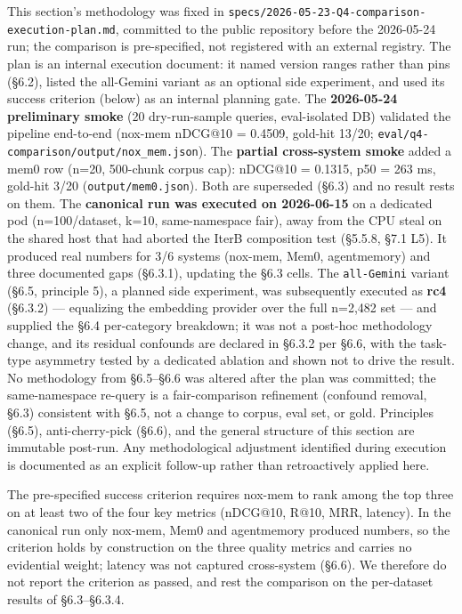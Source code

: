 \documentclass[
]{article}
\begin{document}
This section's methodology was fixed in
\texttt{specs/2026-05-23-Q4-comparison-execution-plan.md}, committed to
the public repository before the 2026-05-24 run; the comparison is
pre-specified, not registered with an external registry. The plan is an
internal execution document: it named version ranges rather than pins
(§6.2), listed the all-Gemini variant as an optional side experiment,
and used its success criterion (below) as an internal planning gate. The
\textbf{2026-05-24 preliminary smoke} (20 dry-run-sample queries,
eval-isolated DB) validated the pipeline end-to-end (nox-mem nDCG@10 =
0.4509, gold-hit 13/20;
\texttt{eval/q4-comparison/output/nox\_mem.json}). The \textbf{partial
cross-system smoke} added a mem0 row (n=20, 500-chunk corpus cap):
nDCG@10 = 0.1315, p50 = 263 ms, gold-hit 3/20
(\texttt{output/mem0.json}). Both are superseded (§6.3) and no result
rests on them. The \textbf{canonical run was executed on 2026-06-15} on
a dedicated pod (n=100/dataset, k=10, same-namespace fair), away from
the CPU steal on the shared host that had aborted the IterB composition
test (§5.5.8, §7.1 L5). It produced real numbers for 3/6 systems
(nox-mem, Mem0, agentmemory) and three documented gaps (§6.3.1),
updating the §6.3 cells. The \texttt{all-Gemini} variant (§6.5,
principle 5), a planned side experiment, was subsequently executed as
\textbf{rc4} (§6.3.2) --- equalizing the embedding provider over the
full n=2,482 set --- and supplied the §6.4 per-category breakdown; it
was not a post-hoc methodology change, and its residual confounds are
declared in §6.3.2 per §6.6, with the task-type asymmetry tested by a
dedicated ablation and shown not to drive the result. No methodology
from §6.5--§6.6 was altered after the plan was committed; the
same-namespace re-query is a fair-comparison refinement (confound
removal, §6.3) consistent with §6.5, not a change to corpus, eval set,
or gold. Principles (§6.5), anti-cherry-pick (§6.6), and the general
structure of this section are immutable post-run. Any methodological
adjustment identified during execution is documented as an explicit
follow-up rather than retroactively applied here.

The pre-specified success criterion requires nox-mem to rank among the
top three on at least two of the four key metrics (nDCG@10, R@10, MRR,
latency). In the canonical run only nox-mem, Mem0 and agentmemory
produced numbers, so the criterion holds by construction on the three
quality metrics and carries no evidential weight; latency was not
captured cross-system (§6.6). We therefore do not report the criterion
as passed, and rest the comparison on the per-dataset results of
§6.3--§6.3.4.
\end{document}
